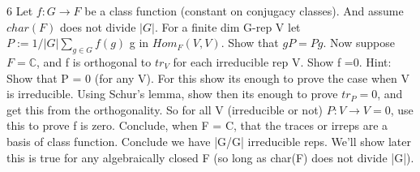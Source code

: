 \documentclass{article}
\newcommand{\C}{\mathbb{C}}
\begin{document}
\begin{PROB}{6}\label{Problem 6.}
    Let $f: G \to F$ be a class function (constant on conjugacy classes). And assume $char(F)$ does not divide $|G|$. For a finite dim G-rep V let  $P := 1/|G| \sum_{g \in G} f(g)$ g in $Hom_F(V,V)$. Show that $gP = Pg$. Now suppose $F = \C$, and f is orthogonal to $tr_V$ for each irreducible rep V. Show f =0. Hint: Show that P = 0 (for any V). For this show its enough to prove the case when V is irreducible. Using Schur's lemma, show then its enough to prove $tr_P = 0$, and get this from the orthogonality. So  for all V (irreducible or not) $P:V \to V =0$, use this to prove f is zero.  Conclude, when F = C, that the traces or irreps are a basis of class function. Conclude we have |G/G| irreducible reps. We'll show later this is true for any algebraically closed F (so long as char(F) does not divide |G|). 
\end{PROB}
\end{document}
